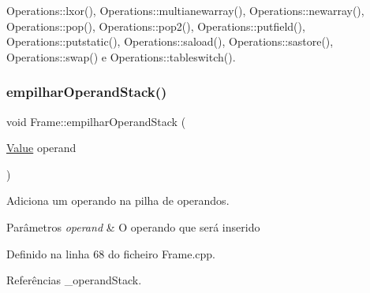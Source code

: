 Operations\+::lxor(), Operations\+::multianewarray(), Operations\+::newarray(), Operations\+::pop(), Operations\+::pop2(), Operations\+::putfield(), Operations\+::putstatic(), Operations\+::saload(), Operations\+::sastore(), Operations\+::swap() e Operations\+::tableswitch().

\mbox{\label{classFrame_af2481010c4795fbe1cba48122609cf1e}} 
\subsubsection{\texorpdfstring{empilhar\+Operand\+Stack()}{empilharOperandStack()}}
{\footnotesize\ttfamily void Frame\+::empilhar\+Operand\+Stack (\begin{DoxyParamCaption}\item[{\hyperlink{structValue}{Value}}]{operand }\end{DoxyParamCaption})}



Adiciona um operando na pilha de operandos. 


\begin{DoxyParams}{Parâmetros}
{\em operand} & O operando que será inserido \\
\hline
\end{DoxyParams}


Definido na linha 68 do ficheiro Frame.\+cpp.



Referências \+\_\+operand\+Stack.



